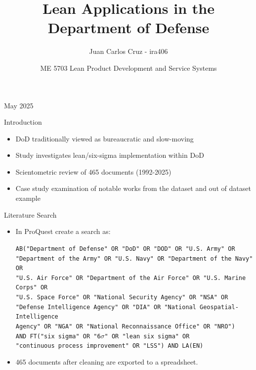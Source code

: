 \documentclass[aspectratio=169,11pt,xcolor={dvipsnames},hyperref={pdftex,pdfpagemode=UseNone,hidelinks,pdfdisplaydoctitle=true},usepdftitle=false]{beamer}
\title{Lean Applications in the Department of Defense}
\author{Juan Carlos Cruz - ira406}
\date{ME 5703 Lean Product Development and Service Systems}
\begin{document}
    
    \begin{frame}
      \titlepage
      May 2025
    \end{frame}
    
    \begin{frame}{Introduction}
      \begin{itemize}
        \item DoD traditionally viewed as bureaucratic and slow-moving
        \item Study investigates lean/six-sigma implementation within DoD
        \item Scientometric review of 465 documents (1992-2025)
        \item Case study examination of notable works from the dataset and out of dataset example
      \end{itemize}
    \end{frame}

    \begin{frame}{Literature Search}
      \begin{itemize}
        \item In ProQuest create a search as:\\
          \begin{minipage}{\linewidth}
          \begin{spacing}{0.8}
          \noindent\texttt{AB("Department of Defense" OR "DoD" OR "DOD" OR "U.S. Army" OR} \\
          \texttt{"Department of the Army" OR "U.S. Navy" OR "Department of the Navy" OR} \\
          \texttt{"U.S. Air Force" OR "Department of the Air Force" OR "U.S. Marine Corps" OR} \\
          \texttt{"U.S. Space Force" OR "National Security Agency" OR "NSA" OR} \\
          \texttt{"Defense Intelligence Agency" OR "DIA" OR "National Geospatial-Intelligence} \\
          \texttt{Agency" OR "NGA" OR "National Reconnaissance Office" OR "NRO")} \\
          \texttt{AND FT("six sigma" OR "6$\sigma$" OR "lean six sigma" OR} \\
          \texttt{"continuous process improvement" OR "LSS") AND LA(EN)}
          \end{spacing}
          \end{minipage}
        \item 465 documents after cleaning are exported to a spreadsheet.
      \end{itemize}
    \end{frame}
\end{document}
